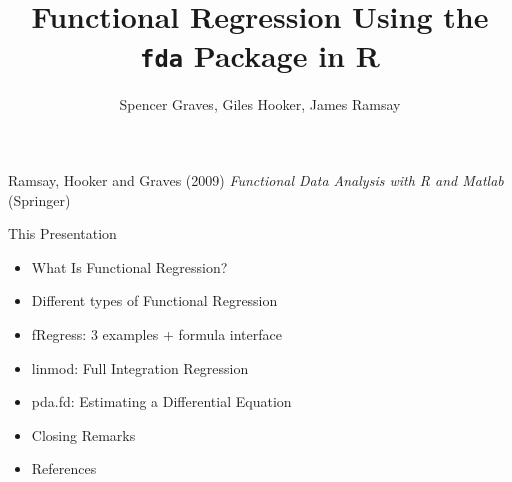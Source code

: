 \documentclass[compress]{beamer}
\begin{document}

\title{
Functional Regression \newline
Using the \texttt{fda} Package in R}
\author{Spencer Graves, Giles Hooker, James Ramsay}

\date{}

\begin{frame}

\maketitle

Ramsay, Hooker and Graves (2009)
\emph{Functional Data Analysis with R and Matlab}
(Springer)

\end{frame}

\begin{frame}{This Presentation}

\begin{itemize}
    \item What Is Functional Regression?

    \item Different types of Functional Regression

    \item fRegress:  3 examples + formula interface 

    \item linmod:  Full Integration Regression

    \item pda.fd:  Estimating a Differential Equation

    \item Closing Remarks

    \item References

\end{itemize}

\end{frame}

\end{document}
